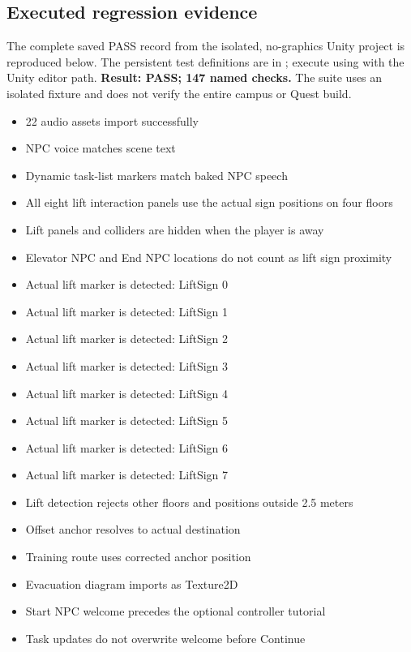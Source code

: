 \documentclass[12pt,a4paper]{article}
\begin{document}
\subsection{Executed regression evidence}
The complete saved PASS record from the isolated, no-graphics Unity project is
reproduced below. The persistent test definitions are in
; execute using
 with the Unity editor path.
\textbf{Result: PASS; 147 named checks.} The suite uses an isolated fixture
and does not verify the entire campus or Quest build.

\begingroup
\small
\begin{itemize}[leftmargin=*,nosep]
\item 22 audio assets import successfully
\item NPC voice matches scene text
\item Dynamic task-list markers match baked NPC speech
\item All eight lift interaction panels use the actual sign positions on four floors
\item Lift panels and colliders are hidden when the player is away
\item Elevator NPC and End NPC locations do not count as lift sign proximity
\item Actual lift marker is detected: LiftSign 0
\item Actual lift marker is detected: LiftSign 1
\item Actual lift marker is detected: LiftSign 2
\item Actual lift marker is detected: LiftSign 3
\item Actual lift marker is detected: LiftSign 4
\item Actual lift marker is detected: LiftSign 5
\item Actual lift marker is detected: LiftSign 6
\item Actual lift marker is detected: LiftSign 7
\item Lift detection rejects other floors and positions outside 2.5 meters
\item Offset anchor resolves to actual destination
\item Training route uses corrected anchor position
\item Evacuation diagram imports as Texture2D
\item Start NPC welcome precedes the optional controller tutorial
\item Task updates do not overwrite welcome before Continue

\end{itemize}
\end{document}
